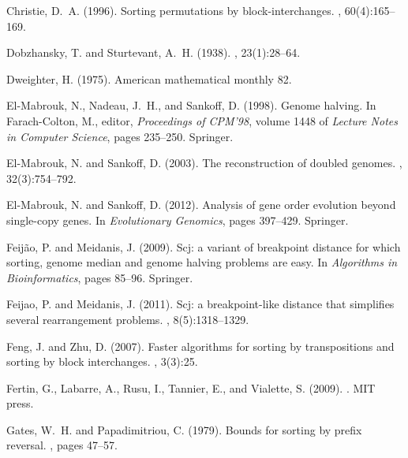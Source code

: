\documentclass[11pt,final,twoside,nofrench]{thlifl}
\begin{document}
{\begin{thebibliography}{}
Christie, D.~A. (1996).
\newblock Sorting permutations by block-interchanges.
, 60(4):165--169.

Dobzhansky, T. and Sturtevant, A.~H. (1938).
, 23(1):28--64.

Dweighter, H. (1975).
\newblock American mathematical monthly 82.

El-Mabrouk, N., Nadeau, J.~H., and Sankoff, D. (1998).
\newblock Genome halving.
\newblock In Farach-Colton, M., editor, {\em Proceedings of CPM'98}, volume
  1448 of {\em Lecture Notes in Computer Science}, pages 235--250. Springer.

El-Mabrouk, N. and Sankoff, D. (2003).
\newblock The reconstruction of doubled genomes.
, 32(3):754--792.

El-Mabrouk, N. and Sankoff, D. (2012).
\newblock Analysis of gene order evolution beyond single-copy genes.
\newblock In {\em Evolutionary Genomics}, pages 397--429. Springer.

Feij{\~a}o, P. and Meidanis, J. (2009).
\newblock Scj: a variant of breakpoint distance for which sorting, genome
  median and genome halving problems are easy.
\newblock In {\em Algorithms in Bioinformatics}, pages 85--96. Springer.

Feijao, P. and Meidanis, J. (2011).
\newblock Scj: a breakpoint-like distance that simplifies several rearrangement
  problems.
, 8(5):1318--1329.

Feng, J. and Zhu, D. (2007).
\newblock Faster algorithms for sorting by transpositions and sorting by block
  interchanges.
, 3(3):25.

Fertin, G., Labarre, A., Rusu, I., Tannier, E., and Vialette, S. (2009).
.
\newblock MIT press.

Gates, W.~H. and Papadimitriou, C. (1979).
\newblock Bounds for sorting by prefix reversal.
, pages 47--57.


\end{thebibliography}}
\end{document}
